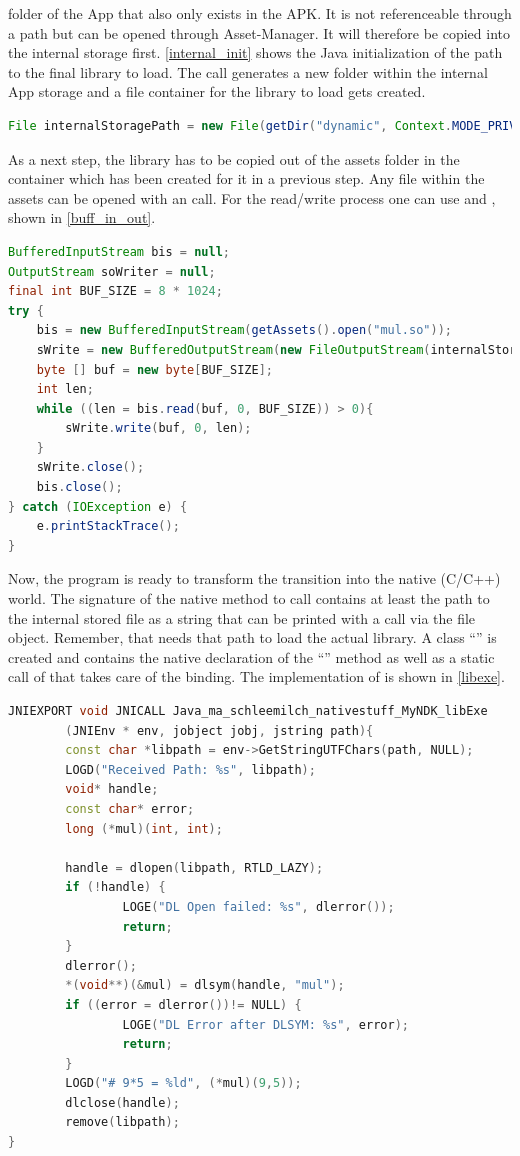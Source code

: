  folder of the App that also only exists in the APK. It is not
referenceable through a path but can be opened through Asset-Manager. It will therefore be copied into the internal storage first. \autoref{internal_init} shows the Java initialization of the path to the final library to load. The  call generates a new folder within the internal App storage and a file container for the library to load gets created.
\begin{lstlisting}[language=Java, caption=Internal Storage Initialization, label=internal_init]
File internalStoragePath = new File(getDir("dynamic", Context.MODE_PRIVATE), "mul.so");
\end{lstlisting}
As a next step, the library has to be copied out of the assets folder in the container which has been created for it in a previous step. Any file within the assets can be opened with an
 call. For the read/write process one can use
 and , shown in
\autoref{buff_in_out}.
\begin{lstlisting}[language=Java, caption=Buffered Input/Output, label=buff_in_out]
BufferedInputStream bis = null;
OutputStream soWriter = null;
final int BUF_SIZE = 8 * 1024;
try {
    bis = new BufferedInputStream(getAssets().open("mul.so"));
    sWrite = new BufferedOutputStream(new FileOutputStream(internalStoragePath));
    byte [] buf = new byte[BUF_SIZE];
    int len;
    while ((len = bis.read(buf, 0, BUF_SIZE)) > 0){
        sWrite.write(buf, 0, len);
    }
    sWrite.close();
    bis.close();
} catch (IOException e) {
    e.printStackTrace();
}
\end{lstlisting}
Now, the program is ready to transform the transition into the native (C/C++) world.
The signature of the native method to call contains at least the path to
the internal stored file as a string that can be printed with a  call via the
 file object. Remember, that  needs that path to load the actual library.
A class ``'' is created and contains the native declaration of the
``'' method as well as a static call of
 that takes care of the binding.
The implementation of  is shown in \autoref{libexe}.\newpage
\begin{lstlisting}[language=C++, caption=Native libExe(), label=libexe]
JNIEXPORT void JNICALL Java_ma_schleemilch_nativestuff_MyNDK_libExe
        (JNIEnv * env, jobject jobj, jstring path){
        const char *libpath = env->GetStringUTFChars(path, NULL);
        LOGD("Received Path: %s", libpath);
        void* handle;
        const char* error;
        long (*mul)(int, int);

        handle = dlopen(libpath, RTLD_LAZY);
        if (!handle) {
                LOGE("DL Open failed: %s", dlerror());
                return;
        }
        dlerror();
        *(void**)(&mul) = dlsym(handle, "mul");
        if ((error = dlerror())!= NULL) {
                LOGE("DL Error after DLSYM: %s", error);
                return;
        }
        LOGD("# 9*5 = %ld", (*mul)(9,5));
        dlclose(handle);
        remove(libpath);
}
\end{lstlisting}
